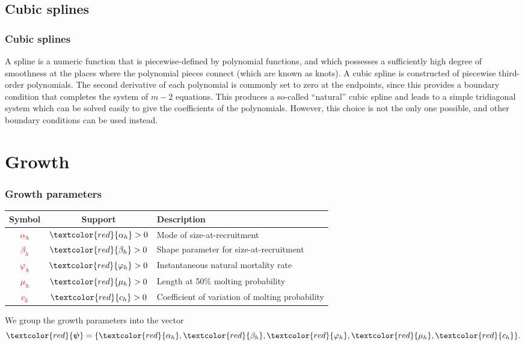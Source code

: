 \documentclass{beamer}
\begin{document}
\subsection{Cubic splines}
\begin{frame}
\frametitle{Cubic splines}
A spline is a numeric function that is piecewise-defined by polynomial
functions, and which possesses a sufficiently high degree of smoothness at the
places where the polynomial pieces connect (which are known as knots). A cubic
spline is constructed of piecewise third-order polynomials. The second
derivative of each polynomial is commonly set to zero at the endpoints, since
this provides a boundary condition that completes the system of $m-2$
equations. This produces a so-called ``natural'' cubic spline and leads to a
simple tridiagonal system which can be solved easily to give the coefficients of
the polynomials. However, this choice is not the only one possible, and other
boundary conditions can be used instead.
\end{frame}


\section{Growth}


\begin{frame}
\frametitle{Growth parameters}
\begin{table}
  \centering
  \begin{tabular}{ccl}
  \hline
  Symbol & Support & Description \\
  \hline
      \textcolor{red}{$\alpha_h$} & $\textcolor{red}{\alpha_h} > 0$ & Mode of size-at-recruitment\\
      \textcolor{red}{$\beta_h$} & $\textcolor{red}{\beta_h} > 0$ & Shape parameter for size-at-recruitment\\
      \textcolor{red}{$\varphi_h$} & $\textcolor{red}{\varphi_h} > 0$ & Instantaneous natural mortality rate\\
      \textcolor{red}{$\mu_h$} & $\textcolor{red}{\mu_h} > 0$ & Length at 50\% molting probability\\
      \textcolor{red}{$c_h$} & $\textcolor{red}{c_h} > 0$ & Coefficient of variation of molting probability\\
  \hline
  \end{tabular}
\end{table}
We group the growth parameters into the vector
\begin{equation*}
  \textcolor{red}{\boldsymbol\psi} = \{ \textcolor{red}{\alpha_h}, 
  \textcolor{red}{\beta_h}, \textcolor{red}{\varphi_h}, \textcolor{red}{\mu_h},
  \textcolor{red}{c_h} \}.
\end{equation*}
\end{frame}
\end{document}
